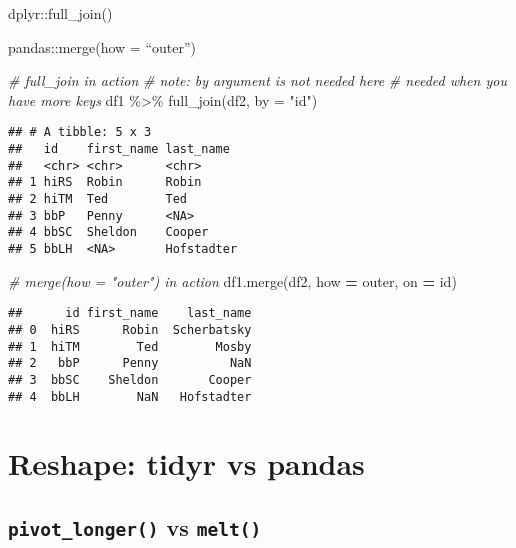 \documentclass[
]{book}
\newenvironment{Shaded}{\begin{snugshade}}{\end{snugshade}}
\newcommand{\AttributeTok}[1]{\textcolor[rgb]{0.77,0.63,0.00}{#1}}
\newcommand{\CommentTok}[1]{\textcolor[rgb]{0.56,0.35,0.01}{\textit{#1}}}
\newcommand{\FunctionTok}[1]{\textcolor[rgb]{0.00,0.00,0.00}{#1}}
\newcommand{\NormalTok}[1]{#1}
\newcommand{\OperatorTok}[1]{\textcolor[rgb]{0.81,0.36,0.00}{\textbf{#1}}}
\newcommand{\SpecialCharTok}[1]{\textcolor[rgb]{0.00,0.00,0.00}{#1}}
\newcommand{\StringTok}[1]{\textcolor[rgb]{0.31,0.60,0.02}{#1}}
\begin{document}
dplyr::full\_join()

pandas::merge(how = ``outer'')

\begin{Shaded}
\begin{Highlighting}[]
\CommentTok{\# full\_join in action}
\CommentTok{\# note: by argument is not needed here}
\CommentTok{\# needed when you have more keys}
\NormalTok{df1 }\SpecialCharTok{\%\textgreater{}\%} \FunctionTok{full\_join}\NormalTok{(df2, }\AttributeTok{by =} \StringTok{"id"}\NormalTok{)}
\end{Highlighting}
\end{Shaded}

\begin{verbatim}
## # A tibble: 5 x 3
##   id    first_name last_name 
##   <chr> <chr>      <chr>     
## 1 hiRS  Robin      Robin     
## 2 hiTM  Ted        Ted       
## 3 bbP   Penny      <NA>      
## 4 bbSC  Sheldon    Cooper    
## 5 bbLH  <NA>       Hofstadter
\end{verbatim}

\begin{Shaded}
\begin{Highlighting}[]
\CommentTok{\# merge(how = "outer") in action}
\NormalTok{df1.merge(df2, how }\OperatorTok{=} \StringTok{\textquotesingle{}outer\textquotesingle{}}\NormalTok{, on }\OperatorTok{=} \StringTok{\textquotesingle{}id\textquotesingle{}}\NormalTok{)}
\end{Highlighting}
\end{Shaded}

\begin{verbatim}
##      id first_name    last_name
## 0  hiRS      Robin  Scherbatsky
## 1  hiTM        Ted        Mosby
## 2   bbP      Penny          NaN
## 3  bbSC    Sheldon       Cooper
## 4  bbLH        NaN   Hofstadter
\end{verbatim}

\hypertarget{reshape-tidyr-vs-pandas}{%
\chapter{Reshape: tidyr vs pandas}\label{reshape-tidyr-vs-pandas}}

\hypertarget{pivot_longer-vs-melt}{%
\section{\texorpdfstring{\texttt{pivot\_longer()} vs \texttt{melt()}}{pivot\_longer() vs melt()}}\label{pivot_longer-vs-melt}}
\end{document}

